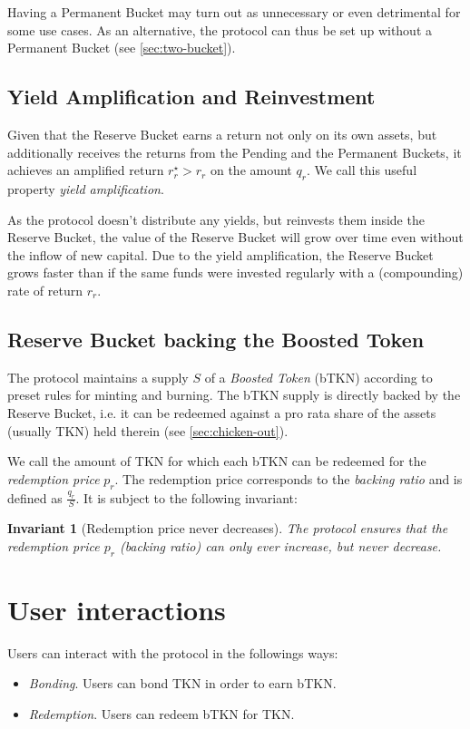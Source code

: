 \documentclass{article}
\newtheorem*{invariant}{Invariant}
\begin{document}
Having a Permanent Bucket may turn out as unnecessary or even detrimental for some use cases. As an alternative, the protocol can thus be set up without a Permanent Bucket (see \ref{sec:two-bucket}).

\subsection{Yield Amplification and Reinvestment}
Given that the Reserve Bucket earns a return not only on its own assets, but additionally receives the returns from the Pending and the Permanent Buckets, it achieves an amplified return $r_r^\star > r_r$ on the amount $q_r$. We call this useful property \textit{yield amplification}.

As the protocol doesn't distribute any yields, but reinvests them inside the Reserve Bucket, the value of the Reserve Bucket will grow over time even without the inflow of new capital. Due to the yield amplification, the Reserve Bucket grows faster than if the same funds were invested regularly with a (compounding) rate of return $r_r$.

\subsection{Reserve Bucket backing the Boosted Token}
The protocol maintains a supply $S$ of a \textit{Boosted Token} (bTKN) according to preset rules for minting and burning. The bTKN supply is directly backed by the Reserve Bucket, i.e. it can be redeemed against a pro rata share of the assets (usually TKN) held therein (see \ref{sec:chicken-out}).

We call the amount of TKN for which each bTKN can be redeemed for the \textit{redemption price} $p_r$. The redemption price  corresponds to the \textit{backing ratio} and is defined as $\frac{q_r}{S}$. It is subject to the following invariant:

\begin{invariant}[Redemption price never decreases]
The protocol ensures that the redemption price $p_r$ (backing ratio) can only ever increase, but never decrease.
\end{invariant}

\section{User interactions}

Users can interact with the protocol in the followings ways:
\begin{itemize}
    \item \textit{Bonding}. Users can bond TKN in order to earn bTKN.
    \item \textit{Redemption}. Users can redeem bTKN for TKN.
\end{itemize}
\end{document}
